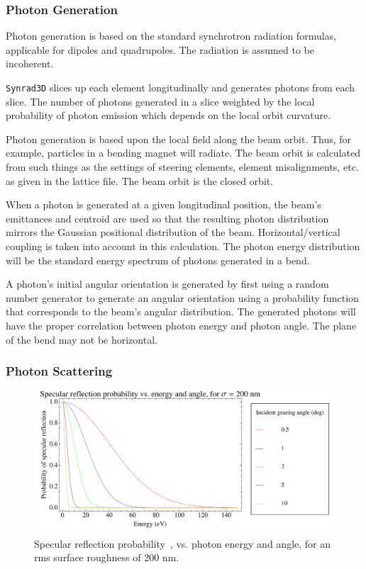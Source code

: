 \subsubsection{Photon Generation}
Photon generation is based on the standard synchrotron radiation formulas, applicable for dipoles and quadrupoles. The radiation is assumed to be incoherent.

\texttt{Synrad3D}\xspace  slices up each element longitudinally and generates photons from each slice. The number of photons generated in a slice weighted by the local probability of photon emission which depends on the local orbit curvature.

Photon generation is based upon the local field along the beam orbit. Thus, for example, particles in a bending magnet will radiate. The beam orbit is calculated from such things as the settings of steering elements, element misalignments, etc. as given in the lattice file. The beam orbit is the closed orbit. 

When a photon is generated at a given longitudinal position, the beam's emittances and centroid are used so that the resulting photon distribution mirrors the Gaussian positional distribution of the beam. Horizontal/vertical coupling is taken into account in this calculation. The photon energy distribution will be the standard energy spectrum of photons generated in a bend.

A photon's initial angular orientation is generated by first using a random number generator to generate an angular orientation using a probability function that corresponds to the beam's angular distribution. The generated photons will have the proper correlation between photon energy and photon angle. The plane of the bend may not be horizontal.
\subsubsection{Photon Scattering} 

  \begin{figure}
  \centering
  \includegraphics[width=6in]{Synrad3d/specular-probability.pdf}
  \caption[Specular reflection probability vs. photon energy and angle]
{\label{f:spec.prob}
Specular reflection probability~\cite{b:beckmann}, vs. photon energy
and angle, for an rms surface roughness of 200 nm.}
  \end{figure}
   

